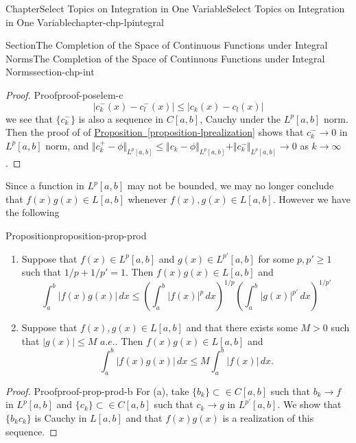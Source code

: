 \documentclass[oneside,10pt,]{book}
\newcommand{\xreffont}{\relax}
\numberwithin{equation}{section}
\begin{document}
\begin{chapterptx}{Chapter}{Select Topics on Integration in One Variable}{}{Select Topics on Integration in One Variable}{}{}{chapter-chp-lpintegral}
\begin{sectionptx}{Section}{The Completion of the Space of Continuous Functions under Integral Norms}{}{The Completion of the Space of Continuous Functions under Integral Norms}{}{}{section-chp-int}
\begin{proof}{Proof}{}{proof-poselem-c}
\begin{equation*}
\vert c_{k}^{-}(x) - c_{l}^{-}(x)\vert \le \vert c_{k}(x) - c_{l}(x)\vert
\end{equation*}
we see that \(\{ c_{k}^{-}\}\) is also a sequence in \(C[a, b]\), Cauchy under the \(L^{p}[a, b]\) norm. Then the proof of of \hyperref[proposition-lprealization]{Proposition~{\xreffont\ref{proposition-lprealization}}} shows that \(c_{k}^{-}\to 0\) in \(L^{p}[a, b]\) norm, and \(\Vert c_{k}^{+}-\phi\Vert_{L^{p}[a, b]}\le \Vert c_{k}-\phi\Vert_{L^{p}[a, b]} + 
\Vert c_{k}^{-}\Vert_{L^{p}[a, b]} \to 0\) as \(k\to \infty\).%
\end{proof}
%
Since a function in \(L^{p}[a, b]\) may not be bounded, we may no longer conclude that \(f(x)g(x)\in L[a, b]\) whenever \(f(x), g(x)\in L[a, b]\). However we have the following%
\begin{proposition}{Proposition}{}{}{proposition-prop-prod}%
%
\begin{enumerate}[label=(\alph*).]
\item{}Suppose that \(f(x)\in L^{p}[a, b]\) and \(g(x)\in L^{p'}[a, b]\) for some \(p, p'\ge1\) such that \(1/p +1/p'=1\). Then \(f(x)g(x)\in L[a, b]\) and%
\begin{equation*}
\int_{a}^{b}|f(x)g(x)|\, dx\le\left( \int_{a}^{b} |f(x)|^{p}\, dx\right)^{1/p} \left( \int_{a}^{b} |g(x)|^{p'}\, dx\right)^{1/p'}
\end{equation*}
%
\item{}Suppose that \(f(x), g(x)\in L[a, b]\) and that  there exists some \(M > 0\) such that \(|g(x)|\le M\) \(a.e.\). Then \(f(x)g(x)\in L[a, b]\) and%
\begin{equation*}
\int_{a}^{b}|f(x)g(x)|\, dx\le M \int_{a}^{b} |f(x)|\, dx\text{.}
\end{equation*}
%
\end{enumerate}
\end{proposition}
\begin{proof}{Proof}{}{proof-prop-prod-b}
For (a), take \(\{b_{k}\}\subset \in C[a, b]\) such that \(b_{k}\to f\) in \(L^{p}[a, b]\) and \(\{c_{k}\} \subset \in C[a, b]\) such that \(c_{k}\to g\) in \(L^{p'}[a, b]\). We show that \(\{b_{k}c_{k}\}\) is Cauchy in \(L[a, b]\) and that \(f(x)g(x)\) is a realization of this sequence.%

\end{proof}
\end{sectionptx}
\end{chapterptx}
\end{document}
